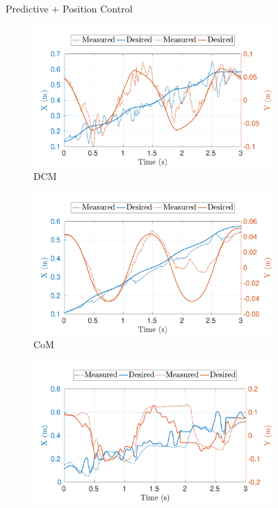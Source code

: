 \begin{figure}[t]
    \begin{myframe}{Predictive + Position Control}
    \centering
    \begin{subfigure}[b]{0.49\textwidth}
        \centering
        \includegraphics[width=\textwidth]{chapter_simplified_benchmarking/figures/mpc_pos-max_vel-dcm.pdf}
        \caption{DCM}
        \label{fig:mpc_pos-max_vel-dcm}
    \end{subfigure}
    \hfill
     \begin{subfigure}[b]{0.49\textwidth}
        \centering
        \includegraphics[width=\textwidth]{chapter_simplified_benchmarking/figures/mpc_pos-max_vel-com.pdf}
        \caption{CoM}
        \label{fig:mpc_pos-max_vel-com}
    \end{subfigure}
    \hfill
    \begin{subfigure}[b]{0.49\textwidth}
        \centering
        \includegraphics[width=\textwidth]{chapter_simplified_benchmarking/figures/mpc_pos-max_vel-zmp.pdf}

\end{subfigure}
\end{myframe}
\end{figure}
